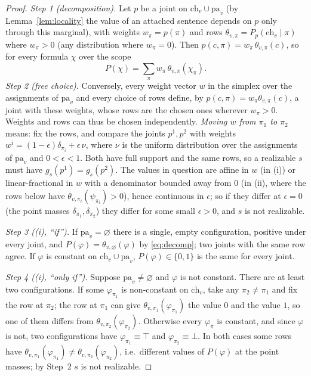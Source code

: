 \documentclass{article} %
\newcommand{\ch}{\mathrm{ch}}
\newcommand{\pa}{\mathrm{pa}}
\begin{document}
\begin{proof}
\emph{Step 1 (decomposition).} Let $p$ be a joint on $\ch_v\cup\pa_v$ (by
Lemma~\ref{lem:locality} the value of an attached sentence depends on $p$ only through this
marginal), with weights $w_\pi=p(\pi)$ and rows $\theta_{v,\pi}=P_p(\ch_v\mid\pi)$ where $w_\pi>0$
(any distribution where $w_\pi=0$). Then $p(c,\pi)=w_\pi\,\theta_{v,\pi}(c)$, so for every formula
$\chi$ over the scope
\begin{equation}\label{eq:decomp}
  P(\chi)=\sum_\pi w_\pi\,\theta_{v,\pi}(\chi_\pi).
\end{equation}
\emph{Step 2 (free choice).} Conversely, every weight vector $w$ in the simplex over the
assignments of $\pa_v$ and every choice of rows define, by $p(c,\pi)=w_\pi\theta_{v,\pi}(c)$, a joint
with these weights, whose rows are the chosen ones wherever $w_\pi>0$. Weights and rows can thus be
chosen independently. \emph{Moving $w$ from $\pi_1$ to $\pi_2$} means: fix the rows, and compare the
joints $p^1,p^2$ with weights $w^i=(1-\epsilon)\delta_{\pi_i}+\epsilon\,\nu$, where $\nu$ is the
uniform distribution over the assignments of $\pa_v$ and $0<\epsilon<1$. Both have full support and
the same rows, so a realizable $s$ must have $g_s(p^1)=g_s(p^2)$. The values in question are affine
in $w$ (in (i)) or linear-fractional in $w$ with a denominator bounded away from $0$ (in (ii), where
the rows below have $\theta_{v,\pi_i}(\psi_{\pi_i})>0$), hence continuous in $\epsilon$; so if they
differ at $\epsilon=0$ (the point masses $\delta_{\pi_1},\delta_{\pi_2}$) they differ for some small
$\epsilon>0$, and $s$ is not realizable.

\emph{Step 3 ((i), ``if'').} If $\pa_v=\varnothing$ there is a single, empty configuration, positive
under every joint, and $P(\varphi)=\theta_{v,\varnothing}(\varphi)$ by \eqref{eq:decomp}; two joints
with the same row agree. If $\varphi$ is constant on $\ch_v\cup\pa_v$, $P(\varphi)\in\{0,1\}$ is the
same for every joint.

\emph{Step 4 ((i), ``only if'').} Suppose $\pa_v\ne\varnothing$ and $\varphi$ is not constant. There
are at least two configurations. If some $\varphi_{\pi_1}$ is non-constant on $\ch_v$, take any
$\pi_2\ne\pi_1$ and fix the row at $\pi_2$; the row at $\pi_1$ can give
$\theta_{v,\pi_1}(\varphi_{\pi_1})$ the value $0$ and the value $1$, so one of them differs from
$\theta_{v,\pi_2}(\varphi_{\pi_2})$. Otherwise every $\varphi_\pi$ is constant, and since $\varphi$ is
not, two configurations have $\varphi_{\pi_1}\equiv\top$ and $\varphi_{\pi_2}\equiv\bot$. In both cases
some rows have $\theta_{v,\pi_1}(\varphi_{\pi_1})\ne\theta_{v,\pi_2}(\varphi_{\pi_2})$, i.e.\ different
values of $P(\varphi)$ at the point masses; by Step~2 $s$ is not realizable.


\end{proof}
\end{document}
